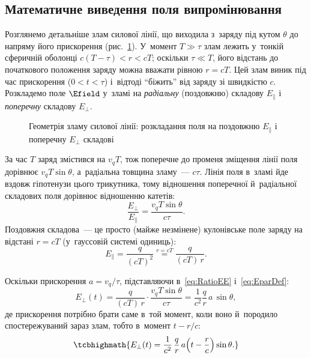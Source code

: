 \subsection*{Математичне виведення поля випромінювання}




Розглянемо детальніше злам силової лінії, що виходила з~заряду під кутом $\theta$ до
напряму його прискорення (рис.~\ref{pic:ElementaryDerivation}). У~момент $T\gg\tau$ злам
лежить у~тонкій сферичній оболонці $c(T-\tau)<r<cT$; оскільки $\tau\ll T$, його відстань
до початкового положення заряду можна вважати рівною $r=cT$. Цей злам виник під час
прискорення ($0<t<\tau$) і~відтоді \enquote{біжить} від заряду зі швидкістю $c$. Розкладемо
поле $\Efield$ у~зламі на \emph{радіальну} (поздовжню) складову $E_\parallel$ і
\emph{поперечну} складову $E_\perp$.

\begin{figure}[h!]\centering
	\caption{Геометрія зламу силової лінії: розкладання поля на поздовжню $E_\parallel$ і
	поперечну $E_\perp$ складові\label{pic:ElementaryDerivation}}
\end{figure}

За час $T$ заряд змістився на $v_qT$, тож поперечне до променя зміщення лінії поля
дорівнює $v_qT\sin\theta$, а~радіальна товщина зламу~--- $c\tau$. Лінія поля в~зламі йде
вздовж гіпотенузи цього трикутника, тому відношення поперечної й~радіальної складових
поля дорівнює відношенню катетів:
\begin{equation}\label{eq:RatioEE}
	\frac{E_\perp}{E_\parallel} = \frac{v_qT\sin\theta}{c\tau}.
\end{equation}
Поздовжня складова~--- це просто (майже незмінене) кулонівське поле заряду на відстані
$r=cT$ (у~гауссовій системі одиниць):
\begin{equation}\label{eq:EparDef}
	E_\parallel = \frac{q}{(cT)^2} \stackrel{r=cT}{=} \frac{q}{(cT)\,r}.
\end{equation}

\nopagebreak[4]
Оскільки прискорення $a=v_q/\tau$, підставляючи в~\eqref{eq:RatioEE} і~\eqref{eq:EparDef}:
\begin{equation}\label{eq:EperpDerivation}
	E_\perp(t) = \frac{q}{(cT)\,r}\cdot\frac{v_qT\sin\theta}{c\tau} =
	\frac1{c^2}\frac{q}{r}\, a\,\sin\theta,
\end{equation}
де прискорення потрібно брати саме в~той момент, коли воно й~породило спостережуваний
зараз злам, тобто в~момент $t-r/c$:
\begin{equation}\label{eq:EperpResult}
	\tcbhighmath{ E_\perp(t) = \frac1{c^2}\,\frac{q}{r}\,
	a\!\left(t-\frac{r}{c}\right)\sin\theta. }
\end{equation}

